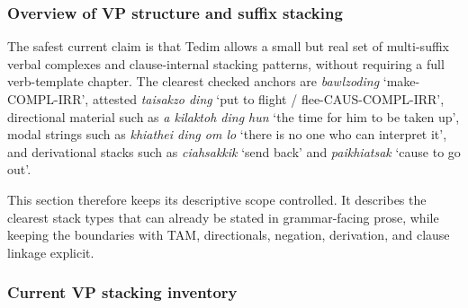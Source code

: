 \documentclass[
  11pt,
  a4paper,
]{article}
\newcommand{\tdim}[1]{\textit{#1}}
\newcommand{\glossquote}[1]{`#1'}
\begin{document}
\subsubsection{Overview of VP structure and suffix
stacking}\label{overview-of-vp-structure-and-suffix-stacking}

The safest current claim is that Tedim allows a small but real set of
multi-suffix verbal complexes and clause-internal stacking patterns,
without requiring a full verb-template chapter. The clearest checked
anchors are \tdim{bawlzoding} \glossquote{make-COMPL-IRR}, attested
\tdim{taisakzo ding} \glossquote{put to flight / flee-CAUS-COMPL-IRR},
directional material such as \tdim{a kilaktoh ding hun}
\glossquote{the time for him to be taken up}, modal strings such as
\tdim{khiathei ding om lo}
\glossquote{there is no one who can interpret it}, and derivational
stacks such as \tdim{ciahsakkik} \glossquote{send back} and
\tdim{paikhiatsak} \glossquote{cause to go out}.

This section therefore keeps its descriptive scope controlled. It
describes the clearest stack types that can already be stated in
grammar-facing prose, while keeping the boundaries with TAM,
directionals, negation, derivation, and clause linkage explicit.

\subsubsection{Current VP stacking
inventory}\label{current-vp-stacking-inventory}
\end{document}
